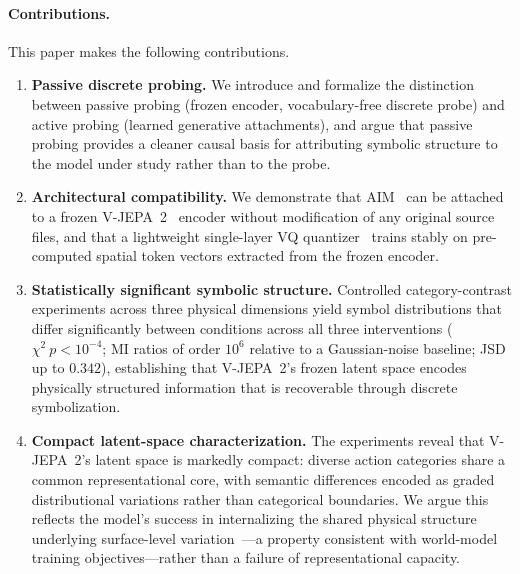 \documentclass{article}
\begin{document}
\paragraph{Contributions.}
This paper makes the following contributions.

\begin{enumerate}

  \item \textbf{Passive discrete probing.}
    We introduce and formalize the distinction between passive probing
    (frozen encoder, vocabulary-free discrete probe) and active probing
    (learned generative attachments), and argue that passive probing
    provides a cleaner causal basis for attributing symbolic structure
    to the model under study rather than to the probe.

  \item \textbf{Architectural compatibility.}
    We demonstrate that AIM~\cite{liu2025aim} can be attached to a
    frozen V-JEPA~2~\cite{assran2025vjepa2} encoder without
    modification of any original source files, and that a lightweight
    single-layer VQ quantizer~\cite{vandenoord2017vqvae} trains stably
    on pre-computed spatial token vectors extracted from the frozen
    encoder.

  \item \textbf{Statistically significant symbolic structure.}
    Controlled category-contrast experiments across three physical
    dimensions yield symbol distributions that differ significantly
    between conditions across all three interventions
    ($\chi^2\ p < 10^{-4}$; MI ratios of order $10^6$ relative to a
    Gaussian-noise baseline; JSD up to $0.342$), establishing that
    V-JEPA~2's frozen latent space encodes physically structured
    information that is recoverable through discrete symbolization.

  \item \textbf{Compact latent-space characterization.}
    The experiments reveal that V-JEPA~2's latent space is markedly
    compact: diverse action categories share a common representational
    core, with semantic differences encoded as graded distributional
    variations rather than categorical boundaries.
    We argue this reflects the model's success in internalizing the
    shared physical structure underlying surface-level
    variation~\cite{lecun2022path,assran2025vjepa2}---a property
    consistent with world-model training objectives---rather than a
    failure of representational capacity.

\end{enumerate}
\end{document}
